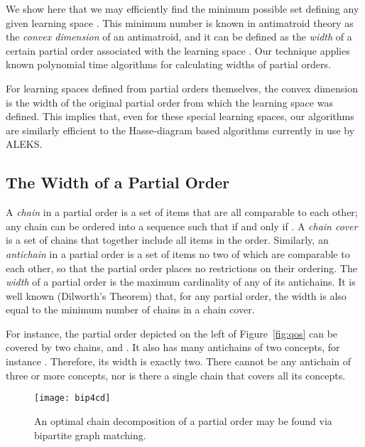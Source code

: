 \documentclass[11pt]{llncs}
\begin{document}
{We show here that we may efficiently find the minimum possible set  defining any given learning space . This minimum number is known in antimatroid theory as the \emph{convex dimension} of an antimatroid, and it can be defined as the \emph{width} of a certain partial order associated with the learning space \citep{KorLovSch-91}.  Our technique applies known polynomial time algorithms for calculating widths of partial orders.

For learning spaces defined from partial orders themselves, the convex dimension is the width of the original partial order from which the learning space was defined. This implies that, even for these special learning spaces, our algorithms are similarly efficient to the Hasse-diagram based algorithms currently in use by ALEKS.

\subsection{The Width of a Partial Order}

A \emph{chain} in a partial order is a set of items that are all comparable to each other; any chain can be ordered into a sequence  such that  if and only if . A \emph{chain cover} is a set of chains that together include all items in the order.
Similarly, an \emph{antichain} in a partial order is a set of items no two of which are comparable to each other, so that the partial order places no restrictions on their ordering.
The \emph{width} of a partial order is the maximum cardinality of any of its antichains.
It is well known (Dilworth's Theorem) that, for any partial order, the width is also equal to the minimum number of chains in a chain cover.

For instance, the partial order depicted on the left of Figure~\ref{fig:qos} can be covered by two chains,  and . It also has many antichains of two concepts, for instance . Therefore, its width is exactly two. There cannot be any antichain of three or more concepts, nor is there a single chain that covers all its concepts.

\begin{figure}[t]
\centering\texttt{[image: bip4cd]}
\caption{An optimal chain decomposition of a partial order may be found via bipartite graph matching.}
\label{fig:bip4cd}
\end{figure}

}
\end{document}
